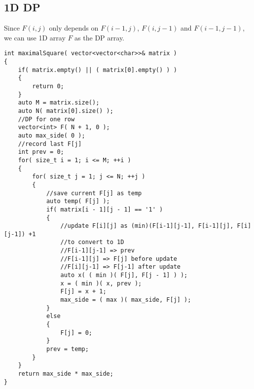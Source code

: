 \subsection{1D DP}
Since $F(i,j)$ only depends on $F(i-1,j)$, $F(i,j-1)$ and $F(i-1,j-1)$, we can use 1D array $F$ as the DP array.

\begin{lstlisting}[style=customc, caption={1D DP}]
int maximalSquare( vector<vector<char>>& matrix )
{
    if( matrix.empty() || ( matrix[0].empty() ) )
    {
        return 0;
    }
    auto M = matrix.size();
    auto N( matrix[0].size() );
    //DP for one row
    vector<int> F( N + 1, 0 );
    auto max_side( 0 );
    //record last F[j]
    int prev = 0;
    for( size_t i = 1; i <= M; ++i )
    {
        for( size_t j = 1; j <= N; ++j )
        {
            //save current F[j] as temp
            auto temp( F[j] );
            if( matrix[i - 1][j - 1] == '1' )
            {
                //update F[i][j] as (min)(F[i-1][j-1], F[i-1][j], F[i][j-1]) +1
                //to convert to 1D
                //F[i-1][j-1] => prev
                //F[i-1][j] => F[j] before update
                //F[i][j-1] => F[j-1] after update
                auto x( ( min )( F[j], F[j - 1] ) );
                x = ( min )( x, prev );
                F[j] = x + 1;
                max_side = ( max )( max_side, F[j] );
            }
            else
            {
                F[j] = 0;
            }
            prev = temp;
        }
    }
    return max_side * max_side;
}
\end{lstlisting}

